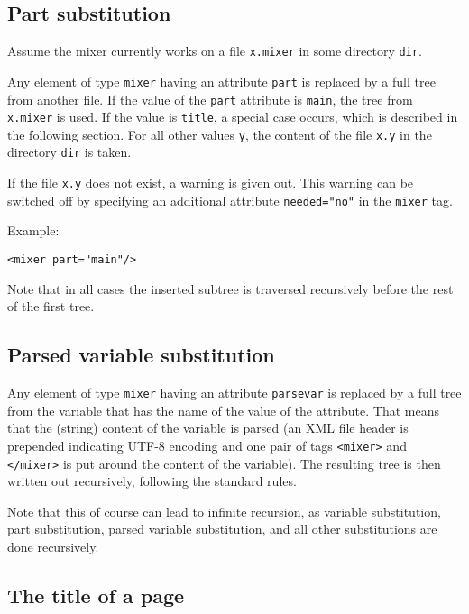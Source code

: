 \documentclass[a4paper,11pt]{article}
\begin{document}
\subsection{Part substitution}
\label{partsubs}

Assume the mixer currently works on a file \verb!x.mixer! in some
directory \verb!dir!.

Any element of type \verb!mixer! having an attribute \verb!part! is replaced
by a full tree from another file. If the value of the \verb!part! attribute
is \verb!main!, the tree from \verb!x.mixer! is used.
If the value is \verb!title!, a special case occurs, which is described
in the following section. For all other values \verb!y!, the content of 
the file \verb!x.y! in the directory \verb!dir! is taken.

If the file \verb!x.y! does not exist, a warning is given out.
This warning can be switched off by specifying an additional attribute
\verb!needed="no"! in the \verb!mixer! tag.

Example:

\begin{verbatim}
<mixer part="main"/>
\end{verbatim}

Note that in all cases the inserted subtree is traversed recursively
before the rest of the first tree.


\subsection{Parsed variable substitution}
\label{parsedvarsub}

Any element of type \verb!mixer! having an attribute \verb!parsevar! is
replaced by a full tree from the variable that has the name of the
value of the attribute. That means that the (string) content of the
variable is parsed (an XML file header is prepended indicating
UTF-8 encoding and one pair of tags \verb!<mixer>! and \verb!</mixer>!
is put around the content of the variable). The resulting tree is
then written out recursively, following the standard rules. 

Note that this of course can lead to infinite recursion, as variable
substitution, part substitution, parsed variable substitution, and 
all other substitutions are done recursively.

\subsection{The title of a page}
\end{document}
